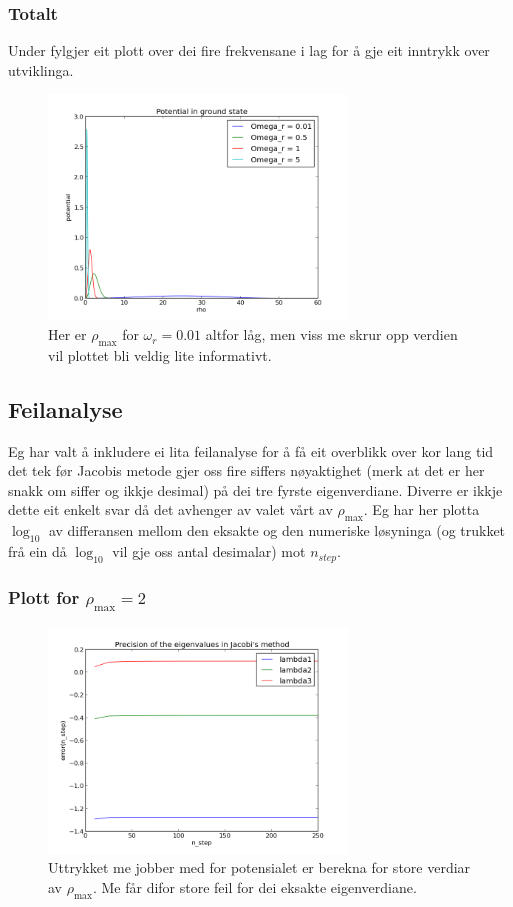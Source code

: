 \documentclass[11pt, a4paper]{article}
\begin{document}
    \subsubsection{Totalt}
      Under fylgjer eit plott over dei fire frekvensane i lag for å gje eit inntrykk over utviklinga.
      \begin{figure}[H]
        \centering
        \includegraphics[width=300px]{total.png}
        \caption{Her er $\rho_{\text{max}}$ for $\omega_r = 0.01$ altfor låg, men viss me skrur opp verdien vil plottet bli veldig lite informativt.}
      \end{figure}

  \subsection{Feilanalyse}
    Eg har valt å inkludere ei lita feilanalyse for å få eit overblikk over kor lang tid det tek før Jacobis metode gjer oss fire siffers nøyaktighet (merk at det er her snakk om 
    siffer og ikkje desimal) på dei tre fyrste eigenverdiane. Diverre er ikkje dette eit enkelt svar då det avhenger av valet vårt av $\rho_{\text{max}}$. Eg har her 
    plotta $\log_{10}$ av differansen mellom den eksakte og den numeriske løsyninga (og trukket frå ein då $\log_{10}$ vil gje oss antal desimalar) mot $n_{step}$.
    
    \subsubsection{Plott for $\rho_{\text{max}} = 2$}
      \begin{figure}[H]
        \centering
        \includegraphics[width=300px]{feil2.png}
        \caption{Uttrykket me jobber med for potensialet er berekna for store verdiar av $\rho_{\text{max}}$. Me får difor store feil for dei eksakte eigenverdiane.}
      \end{figure}
\end{document}
